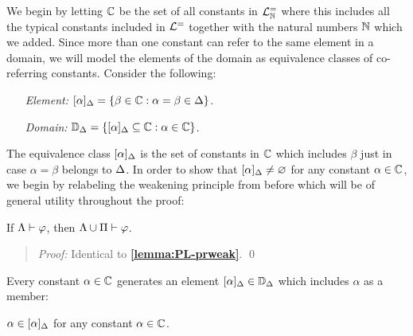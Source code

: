 We begin by letting $\mathbb{C}$ be the set of all constants in $\mathcal{L}^{=}_{\mathbb{N}}$ where this includes all the typical constants included in $\mathcal{L}^{=}$ together with the natural numbers $\mathbb{N}$ which we added. 
Since more than one constant can refer to the same element in a domain, we will model the elements of the domain as equivalence classes of co-referring constants.
Consider the following:
  \begin{enumerate}[leftmargin=1.5in]
    \item[\it Element:] $[\alpha]_{\Delta}=\lbrace\beta\in\mathbb{C} : \alpha=\beta\in\Delta\rbrace$.
    \item[\it Domain:] $\mathbb{D}_{\Delta}=\lbrace[\alpha]_{\Delta} \subseteq \mathbb{C} : \alpha\in\mathbb{C}\rbrace$.
  \end{enumerate}
The equivalence class $[\alpha]_{\Delta}$ is the set of constants in $\mathbb{C}$ which includes $\beta$ just in case $\alpha=\beta$ belongs to $\Delta$.
In order to show that $[\alpha]_{\Delta}\neq\varnothing$ for any constant $\alpha\in\mathbb{C}$, we begin by relabeling the weakening principle from before which will be of general utility throughout the proof:





\begin{Lthm} \label{lemma:prweak}
  If $\Lambda\vdash\varphi$, then $\Lambda\cup\Pi\vdash\varphi$.
\end{Lthm}

\begin{quote} 
  \textit{Proof:} 
  Identical to \textbf{\ref{lemma:PL-prweak}}.
  \qed
\end{quote}



Every constant $\alpha\in\mathbb{C}$ generates an element $[\alpha]_{\Delta}\in\mathbb{D}_{\Delta}$ which includes $\alpha$ as a member: 


\begin{Lthm} \label{lemma:nonempty}
  $\alpha\in[\alpha]_{\Delta}$ for any constant $\alpha\in\mathbb{C}$.
\end{Lthm}

